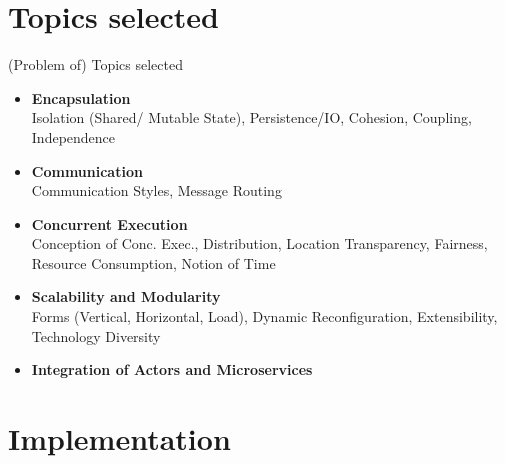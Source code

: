 \documentclass{beamer}
\begin{document}

\section{Topics selected}


\begin{frame}{(Problem of) Topics selected}

\begin{itemize}
  \item \textbf{Encapsulation} \\%
        Isolation (Shared/ Mutable State), Persistence/IO, Cohesion, Coupling, Independence
  \item \textbf{Communication} \\%
        Communication Styles, Message Routing
  \item \textbf{Concurrent Execution} \\%
        Conception of Conc. Exec., Distribution, Location Transparency, Fairness, Resource Consumption, Notion of Time
  \item \textbf{Scalability and Modularity} \\%
        Forms (Vertical, Horizontal, Load), Dynamic Reconfiguration, Extensibility, Technology Diversity
  \item \textbf{Integration of Actors and Microservices}
\end{itemize}

\end{frame}


\section{Implementation}

\end{document}
